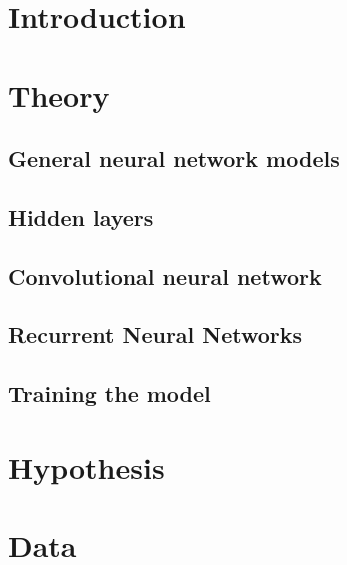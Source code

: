 \documentclass[a4paper]{article}
\begin{document}
\maketitle

\newpage
\tableofcontents
\newpage

\section{Introduction}

\section{Theory}
\subsection{General neural network models} %


\subsection{Hidden layers} %


\subsection{Convolutional neural network}%


\subsection{Recurrent Neural Networks}%


\subsection{Training the model}

\section{Hypothesis} %

\section{Data} %

\end{document}
